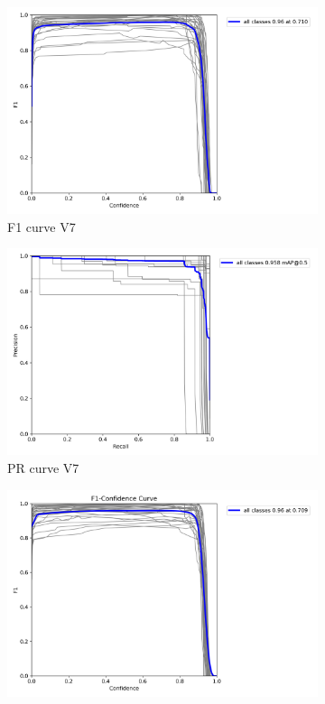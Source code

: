 \documentclass[letterpaper,11pt]{report}
\begin{document}
\begin{figure}[h!]
    \begin{subfigure}[t]{0.4\textwidth}
        \centering
        \includegraphics[width=\textwidth]{F1_curve_v7.png}
        \caption{F1 curve V7}
        \label{fig:image5}
    \end{subfigure}
    \hfill
    \begin{subfigure}[t]{0.4\textwidth}
        \centering
        \includegraphics[width=\textwidth]{PR_curve_v7.png}
        \caption{PR curve V7}
        \label{fig:image6}
    \end{subfigure}
    \hfill
    \begin{subfigure}[t]{0.4\textwidth}
        \centering
        \includegraphics[width=\textwidth]{F1_curve_v8s.png}

\end{subfigure}
\end{figure}
\end{document}
